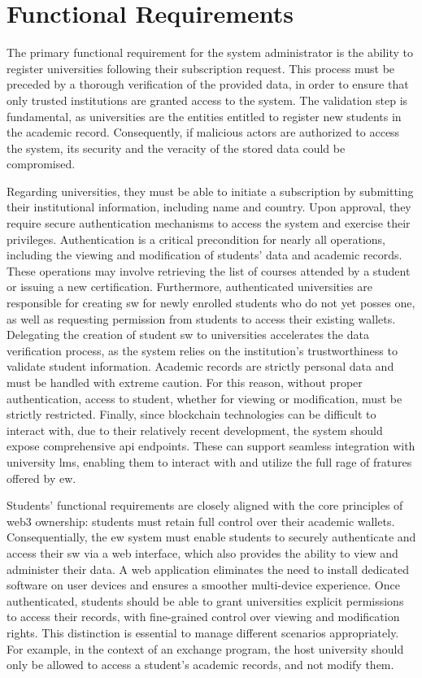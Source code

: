 \section{Functional Requirements}
The primary functional requirement for the system administrator is the ability to register universities following their subscription request. This process must be preceded by a thorough verification of the provided data, in order to ensure that only trusted institutions are granted access to the system. The validation step is fundamental, as universities are the entities entitled to register new students in the academic record. Consequently, if malicious actors are authorized to access the system, its security and the veracity of the stored data could be compromised.

Regarding universities, they must be able to initiate a subscription by submitting their institutional information, including name and country. Upon approval, they require secure authentication mechanisms to access the system and exercise their privileges. Authentication is a critical precondition for nearly all operations, including the viewing and modification of students' data and academic records. These operations may involve retrieving the list of courses attended by a student or issuing a new certification. Furthermore, authenticated universities are responsible for creating \acrfull{sw} for newly enrolled students who do not yet posses one, as well as requesting permission from students to access their existing wallets. Delegating the creation of student \acrshort{sw} to universities accelerates the data verification process, as the system relies on the institution's trustworthiness to validate student information. Academic records are strictly personal data and must be handled with extreme caution. For this reason, without proper authentication, access to student, whether for viewing or modification, must be strictly restricted. 
Finally, since blockchain technologies can be difficult to interact with, due to their relatively recent development, the system should expose comprehensive \acrfull{api} endpoints. These can support seamless integration with university \acrfull{lms}, enabling them to interact with and utilize the full rage of fratures offered by \acrlong{ew}.

Students' functional requirements are closely aligned with the core principles of \Gls{web3} ownership: students must retain full control over their academic wallets. Consequentially, the \acrshort{ew} system must enable students to securely authenticate and access their \acrshort{sw} via a web interface, which also provides the ability to view and administer their data. A web application eliminates the need to install dedicated software on user devices and ensures a smoother multi-device experience.
Once authenticated, students should be able to grant universities explicit permissions to access their records, with fine-grained control over viewing and modification rights. This distinction is essential to manage different scenarios appropriately. For example, in the context of an exchange program, the host university should only be allowed to access a student's academic records, and not modify them.

